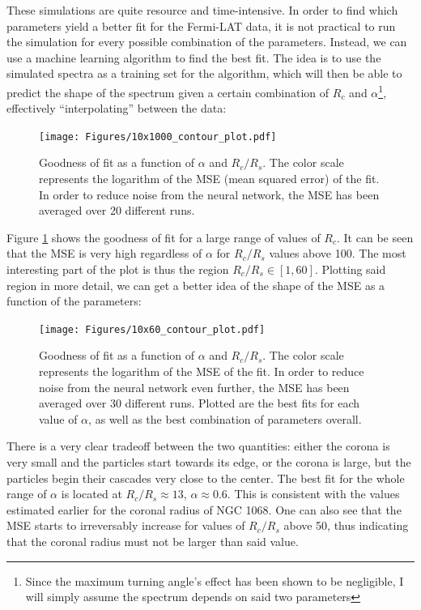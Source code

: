 These simulations are quite resource and time-intensive. In order to find which parameters yield a better fit for the Fermi-LAT data, it is not practical to run the simulation for every possible combination of the parameters. Instead, we can use a machine learning algorithm to find the best fit. The idea is to use the simulated spectra as a training set for the algorithm, which will then be able to predict the shape of the spectrum given a certain combination of $R_c$ and $\alpha$\footnote{Since the maximum turning angle's effect has been shown to be negligible, I will simply assume the spectrum depends on said two parameters}, effectively ``interpolating'' between the data:

\begin{figure}[H]
    \texttt{[image: Figures/10x1000\_contour\_plot.pdf]}
    \centering
    \caption{Goodness of fit as a function of $\alpha$ and $R_c/R_s$. The color scale represents the logarithm of the MSE (mean squared error) of the fit. In order to reduce noise from the neural network, the MSE has been averaged over 20 different runs.}
    \label{fig:contour_plot_10x1000}
\end{figure}

Figure \ref{fig:contour_plot_10x1000} shows the goodness of fit for a large range of values of $R_c$. It can be seen that the MSE is very high regardless of $\alpha$ for $R_c/R_s$ values above 100. The most interesting part of the plot is thus the region $R_c/R_s \in [1, 60]$. Plotting said region in more detail, we can get a better idea of the shape of the MSE as a function of the parameters:
\begin{figure}[H]
    \texttt{[image: Figures/10x60\_contour\_plot.pdf]}
    \centering
    \caption{Goodness of fit as a function of $\alpha$ and $R_c/R_s$. The color scale represents the logarithm of the MSE of the fit. In order to reduce noise from the neural network even further, the MSE has been averaged over 30 different runs. Plotted are the best fits for each value of $\alpha$, as well as the best combination of parameters overall.}
    \label{fig:contour_plot_10x60}
\end{figure}

There is a very clear tradeoff between the two quantities: either the corona is very small and the particles start towards its edge, or the corona is large, but the particles begin their cascades very close to the center. The best fit for the whole range of $\alpha$ is located at $R_c/R_s \approx 13$, $\alpha \approx 0.6$. This is consistent with the values estimated earlier for the coronal radius of NGC 1068. One can also see that the MSE starts to irreversably increase for values of $R_c/R_s$ above 50, thus indicating that the coronal radius must not be larger than said value.

